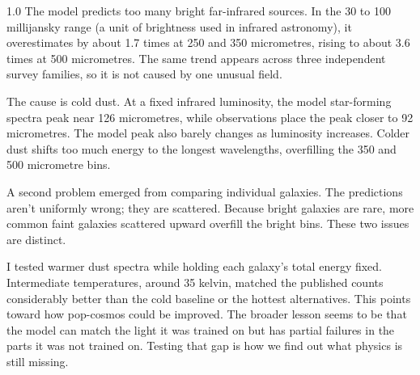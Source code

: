 \documentclass[12pt,a4paper]{article}
\begin{document}
\begin{spacing}{1.0}
The model predicts too many bright far-infrared sources. In the 30 to 100 millijansky
range (a unit of brightness used in infrared astronomy), it overestimates by about 1.7 times at 250 and 350 micrometres, rising to about
3.6 times at 500 micrometres. The same trend appears across three independent survey
families, so it is not caused by one unusual field.

The cause is cold dust. At a fixed infrared luminosity, the model star-forming spectra
peak near 126 micrometres, while observations place the peak closer to 92 micrometres.
The model peak also barely changes as luminosity increases. Colder dust shifts too much
energy to the longest wavelengths, overfilling the 350 and 500 micrometre bins.

A second problem emerged from comparing individual galaxies. The predictions aren't
uniformly wrong; they are scattered. Because bright galaxies are rare, more common faint galaxies scattered upward overfill the bright bins. These two issues are
distinct.

I tested warmer dust spectra while holding each galaxy's total energy fixed.
Intermediate temperatures, around 35 kelvin, matched the published counts considerably
better than the cold baseline or the hottest alternatives. This points toward how pop-cosmos could be improved. The broader lesson seems to be that the model can
match the light it was trained on but has partial failures in the parts it was not trained on.
Testing that gap is how we find out what physics is still missing.

\end{spacing}
\restoregeometry
\end{document}
